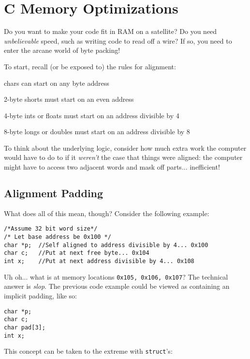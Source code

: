 \documentclass[10pt]{article}
\renewcommand{\#}{\raisebox{.22ex}{\large\old}}
\begin{document}
\section{C Memory Optimizations}
Do you want to make your code fit in RAM on a satellite? Do you need \textit{unbelievable} speed, such as writing code to read off a wire? If so, you need to enter the arcane world of byte packing!

\noindent To start, recall (or be exposed to) the rules for alignment:

\begin{enumerate*}
  \item chars can start on any byte address
  \item 2-byte shorts must start on an even address
  \item 4-byte ints or floats must start on an address divisible by 4
  \item 8-byte longs or doubles must start on an address divisible by 8
\end{enumerate*}

\noindent To think about the underlying logic, consider how much extra work the computer would have to do to if it \textit{weren't} the case that things were aligned: the computer might have to access two adjacent words and mask off parts... inefficient!

\newpage

\subsection{Alignment Padding}
What does all of this mean, though? Consider the following example:

\begin{lstlisting}
/*Assume 32 bit word size*/
/* Let base address be 0x100 */
char *p;  //Self aligned to address divisible by 4... 0x100
char c;   //Put at next free byte... 0x104
int x;    //Put at next address divisible by 4... 0x108
\end{lstlisting}

\noindent Uh oh... what is at memory locations \texttt{0x105, 0x106, 0x107}? The technical answer is \textit{slop}. The previous code example could be viewed as containing an implicit padding, like so:

\begin{lstlisting}
char *p;
char c;
char pad[3];
int x;
\end{lstlisting}

\noindent This concept can be taken to the extreme with \texttt{struct}'s:
\end{document}
